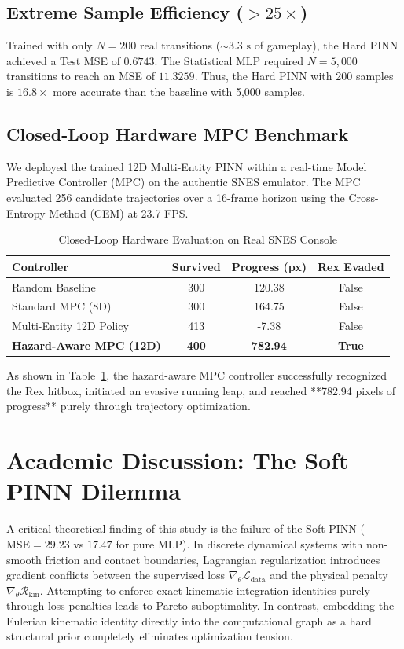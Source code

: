 \documentclass[10pt,twocolumn,letterpaper]{article}
\begin{document}
\subsection{Extreme Sample Efficiency ($>25\times$)}
Trained with only $N = 200$ real transitions ($\sim 3.3\text{ s}$ of gameplay), the Hard PINN achieved a Test MSE of $0.6743$. The Statistical MLP required $N = 5,000$ transitions to reach an MSE of $11.3259$. Thus, the Hard PINN with 200 samples is $16.8\times$ more accurate than the baseline with 5,000 samples.

\subsection{Closed-Loop Hardware MPC Benchmark}
We deployed the trained 12D Multi-Entity PINN within a real-time Model Predictive Controller (MPC) on the authentic SNES emulator. The MPC evaluated 256 candidate trajectories over a 16-frame horizon using the Cross-Entropy Method (CEM) at 23.7 FPS.

\begin{table}[ht]
\centering
\small
\caption{Closed-Loop Hardware Evaluation on Real SNES Console}
\label{tab:mpc_results}
\begin{tabular}{lccc}
\toprule
\textbf{Controller} & \textbf{Survived} & \textbf{Progress (px)} & \textbf{Rex Evaded} \\
\midrule
Random Baseline & 300 & 120.38 & False \\
Standard MPC (8D) & 300 & 164.75 & False \\
Multi-Entity 12D Policy & 413 & -7.38 & False \\
\textbf{Hazard-Aware MPC (12D)} & \textbf{400} & \textbf{782.94} & \textbf{True} \\
\bottomrule
\end{tabular}
\end{table}

As shown in Table~\ref{tab:mpc_results}, the hazard-aware MPC controller successfully recognized the Rex hitbox, initiated an evasive running leap, and reached **782.94 pixels of progress** purely through trajectory optimization.

\section{Academic Discussion: The Soft PINN Dilemma}
A critical theoretical finding of this study is the failure of the Soft PINN ($\text{MSE} = 29.23$ vs $17.47$ for pure MLP). In discrete dynamical systems with non-smooth friction and contact boundaries, Lagrangian regularization introduces gradient conflicts between the supervised loss $\nabla_\theta \mathcal{L}_{\text{data}}$ and the physical penalty $\nabla_\theta \mathcal{R}_{\text{kin}}$. Attempting to enforce exact kinematic integration identities purely through loss penalties leads to Pareto suboptimality. In contrast, embedding the Eulerian kinematic identity directly into the computational graph as a hard structural prior completely eliminates optimization tension.
\end{document}
